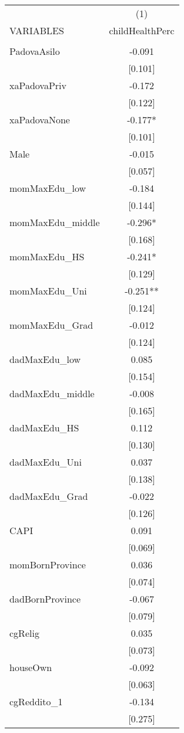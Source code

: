 \documentclass[]{article}
\begin{document}
\begin{tabular}{lc} \hline
 & (1) \\
VARIABLES & childHealthPerc \\ \hline
 &  \\
PadovaAsilo & -0.091 \\
 & [0.101] \\
xaPadovaPriv & -0.172 \\
 & [0.122] \\
xaPadovaNone & -0.177* \\
 & [0.101] \\
Male & -0.015 \\
 & [0.057] \\
momMaxEdu\_low & -0.184 \\
 & [0.144] \\
momMaxEdu\_middle & -0.296* \\
 & [0.168] \\
momMaxEdu\_HS & -0.241* \\
 & [0.129] \\
momMaxEdu\_Uni & -0.251** \\
 & [0.124] \\
momMaxEdu\_Grad & -0.012 \\
 & [0.124] \\
dadMaxEdu\_low & 0.085 \\
 & [0.154] \\
dadMaxEdu\_middle & -0.008 \\
 & [0.165] \\
dadMaxEdu\_HS & 0.112 \\
 & [0.130] \\
dadMaxEdu\_Uni & 0.037 \\
 & [0.138] \\
dadMaxEdu\_Grad & -0.022 \\
 & [0.126] \\
CAPI & 0.091 \\
 & [0.069] \\
momBornProvince & 0.036 \\
 & [0.074] \\
dadBornProvince & -0.067 \\
 & [0.079] \\
cgRelig & 0.035 \\
 & [0.073] \\
houseOwn & -0.092 \\
 & [0.063] \\
cgReddito\_1 & -0.134 \\
 & [0.275] \\

\end{tabular}
\end{document}
